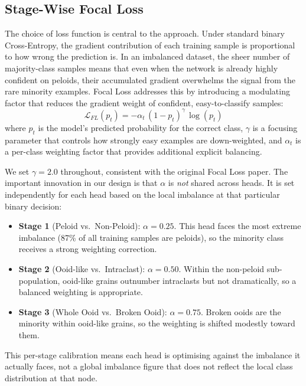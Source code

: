 \documentclass[a4paper,fleqn]{cas-dc}
\begin{document}
\subsection{Stage-Wise Focal Loss}
The choice of loss function is central to the approach. Under standard binary Cross-Entropy, the gradient contribution of each training sample is proportional to how wrong the prediction is. In an imbalanced dataset, the sheer number of majority-class samples means that even when the network is already highly confident on peloids, their accumulated gradient overwhelms the signal from the rare minority examples. Focal Loss \citep{lin2017focal} addresses this by introducing a modulating factor that reduces the gradient weight of confident, easy-to-classify samples:
\begin{equation}
\mathcal{L}_{FL}(p_t) = -\alpha_t\,(1 - p_t)^{\gamma}\,\log(p_t)
\end{equation}
where $p_t$ is the model's predicted probability for the correct class, $\gamma$ is a focusing parameter that controls how strongly easy examples are down-weighted, and $\alpha_t$ is a per-class weighting factor that provides additional explicit balancing.

We set $\gamma = 2.0$ throughout, consistent with the original Focal Loss paper. The important innovation in our design is that $\alpha$ is \textit{not} shared across heads. It is set independently for each head based on the local imbalance at that particular binary decision:
\begin{itemize}
  \item \textbf{Stage 1} (Peloid vs.\ Non-Peloid): $\alpha = 0.25$. This head faces the most extreme imbalance (87\% of all training samples are peloids), so the minority class receives a strong weighting correction.
  \item \textbf{Stage 2} (Ooid-like vs.\ Intraclast): $\alpha = 0.50$. Within the non-peloid sub-population, ooid-like grains outnumber intraclasts but not dramatically, so a balanced weighting is appropriate.
  \item \textbf{Stage 3} (Whole Ooid vs.\ Broken Ooid): $\alpha = 0.75$. Broken ooids are the minority within ooid-like grains, so the weighting is shifted modestly toward them.
\end{itemize}
This per-stage calibration means each head is optimising against the imbalance it actually faces, not a global imbalance figure that does not reflect the local class distribution at that node.
\end{document}
